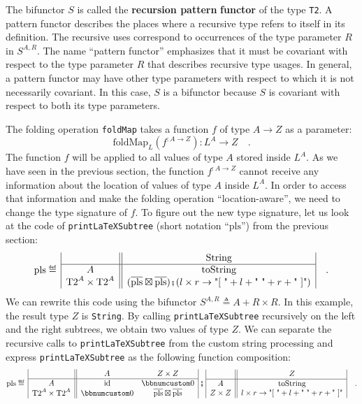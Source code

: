 The bifunctor $S$ is called the \textbf{recursion
pattern} \textbf{functor}
of the type \lstinline!T2!. A pattern functor describes the places
where a recursive type refers to itself in its definition. The recursive
uses correspond to occurrences of the type parameter $R$ in $S^{A,R}$.
The name \textsf{``}pattern functor\textsf{''} emphasizes that it must be covariant
with respect to the type parameter $R$ that describes recursive type
usages. In general, a pattern functor may have other type parameters
with respect to which it is not necessarily covariant. In this case,
$S$ is a bifunctor because $S$ is covariant with respect to both
its type parameters. 

The folding operation \lstinline!foldMap! takes a function $f$ of
type $A\rightarrow Z$ as a parameter:
\[
\text{foldMap}_{L}(f^{:A\rightarrow Z}):L^{A}\rightarrow Z\quad.
\]
The function $f$ will be applied to all values of type $A$ stored
inside $L^{A}$. As we have seen in the previous section, the function
$f^{:A\rightarrow Z}$ cannot receive any information about the location
of values of type $A$ inside $L^{A}$. In order to access that information
and make the folding operation \textsf{``}location-aware\textsf{''}, we need to change
the type signature of $f$. To figure out the new type signature,
let us look at the code of \lstinline!printLaTeXSubtree! (short notation
\textsf{``}$\text{pls}$\textsf{''}) from the previous section:
\[
\text{pls}\triangleq\,\begin{array}{|c||c|}
 & \text{String}\\
\hline A & \text{toString}\\
\text{T2}^{A}\times\text{T2}^{A} & (\overline{\text{pls}}\boxtimes\overline{\text{pls}})\bef(l\times r\rightarrow\text{"[ "}+l+\text{" "}+r+\text{" ]"})
\end{array}\quad.
\]
We can rewrite this code using the bifunctor $S^{A,R}\triangleq A+R\times R$.
In this example, the result type $Z$ is \lstinline!String!. By calling
\lstinline!printLaTeXSubtree! recursively on the left and the right
subtrees, we obtain two values of type $Z$. We can separate the recursive
calls to \lstinline!printLaTeXSubtree! from the custom string processing
and express \lstinline!printLaTeXSubtree! as the following function
composition:
\[
\text{pls}\triangleq\,\begin{array}{|c||cc|}
 & A & Z\times Z\\
\hline A & \text{id} & \bbnum 0\\
\text{T2}^{A}\times\text{T2}^{A} & \bbnum 0 & \overline{\text{pls}}\boxtimes\overline{\text{pls}}
\end{array}\,\bef\,\begin{array}{|c||c|}
 & Z\\
\hline A & \text{toString}\\
Z\times Z & l\times r\rightarrow\text{"[ "}+l+\text{" "}+r+\text{" ]"}
\end{array}\quad.
\]
